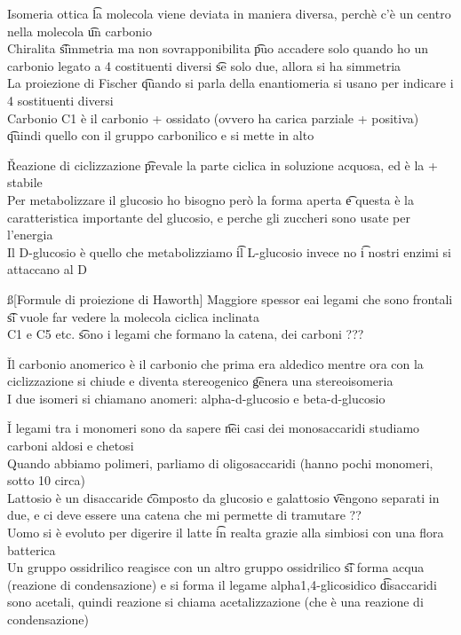 \documentclass[12pt]{article}
\begin{document}
\s[Bo]
Isomeria ottica \t la molecola viene deviata in maniera diversa, perchè c'è un centro nella molecola \t un carbonio \\
Chiralita \t simmetria ma non sovrapponibilita \t puo accadere solo quando ho un carbonio legato a 4 costituenti diversi \t se solo due, allora si ha simmetria \\
La proiezione di Fischer \t quando si parla della enantiomeria si usano per indicare i 4 sostituenti diversi \\
Carbonio C1 è il carbonio + ossidato (ovvero ha carica parziale + positiva) \t quindi quello con il gruppo carbonilico e si mette in alto

\v

Reazione di ciclizzazione \t prevale la parte ciclica in soluzione acquosa, ed è la + stabile \\
Per metabolizzare il glucosio ho bisogno però la forma aperta \t e questa è la caratteristica importante del glucosio, e perche gli zuccheri sono usate per l'energia \\
Il D-glucosio è quello che metabolizziamo \t il L-glucosio invece no \t i nostri enzimi si attaccano al D

\ss[Formule di proiezione di Haworth]
Maggiore spessor eai legami che sono frontali \t si vuole far vedere la molecola ciclica inclinata \\
C1 e C5 etc. \t sono i legami che formano la catena, dei carboni ???

\v

Il carbonio anomerico è il carbonio che prima era aldedico mentre ora con la ciclizzazione si chiude e diventa stereogenico \t genera una stereoisomeria \\
I due isomeri si chiamano anomeri: alpha-d-glucosio e beta-d-glucosio

\v

I legami tra i monomeri sono da sapere \t nei casi dei monosaccaridi studiamo carboni aldosi e chetosi \\
Quando abbiamo polimeri, parliamo di oligosaccaridi (hanno pochi monomeri, sotto 10 circa) \\
Lattosio è un disaccaride \t composto da glucosio e galattosio \t vengono separati in due, e ci deve essere una catena che mi permette di tramutare ?? \\
Uomo si è evoluto per digerire il latte \t in realta grazie alla simbiosi con una flora batterica \\
Un gruppo ossidrilico reagisce con un altro gruppo ossidrilico \t si forma acqua (reazione di condensazione) e si forma il legame alpha1,4-glicosidico \t disaccaridi sono acetali, quindi reazione si chiama acetalizzazione (che è una reazione di condensazione)
\end{document}

